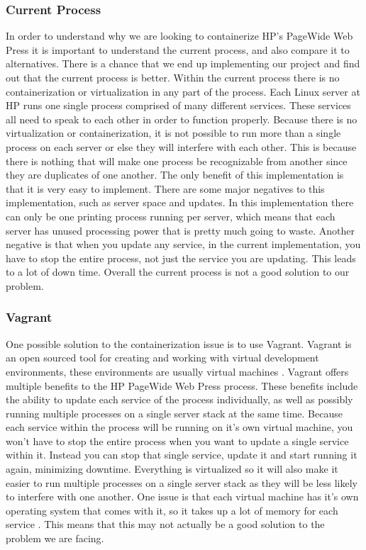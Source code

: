 \documentclass[onecolumn, draftclsnofoot,10pt, compsoc]{IEEEtran}
\begin{document}
    \subsubsection{Current Process}
    In order to understand why we are looking to containerize HP's PageWide Web Press it is important to understand the current process, and also compare it to alternatives. There is a chance that we end up implementing our project and find out that the current process is better. Within the current process there is no containerization or virtualization in any part of the process. Each Linux server at HP runs one single process comprised of many different services. These services all need to speak to each other in order to function properly. Because there is no virtualization or containerization, it is not possible to run more than a single process on each server or else they will interfere with each other. This is because there is nothing that will make one process be recognizable from another since they are duplicates of one another. The only benefit of this implementation is that it is very easy to implement. There are some major negatives to this implementation, such as server space and updates. In this implementation there can only be one printing process running per server, which means that each server has unused processing power that is pretty much going to waste. Another negative is that when you update any service, in the current implementation, you have to stop the entire process, not just the service you are updating. This leads to a lot of down time. Overall the current process is not a good solution to our problem.

    \subsubsection{Vagrant}
    One possible solution to the containerization issue is to use Vagrant. Vagrant is an open sourced tool for creating and working with virtual development environments, these environments are usually virtual machines \cite{vagrant}. Vagrant offers multiple benefits to the HP PageWide Web Press process. These benefits include the ability to update each service of the process individually, as well as possibly running multiple processes on a single server stack at the same time. Because each service within the process will be running on it's own virtual machine, you won't have to stop the entire process when you want to update a single service within it. Instead you can stop that single service, update it and start running it again, minimizing downtime. Everything is virtualized so it will also make it easier to run multiple processes on a single server stack as they will be less likely to interfere with one another. One issue is that each virtual machine has it's own operating system that comes with it, so it takes up a lot of memory for each service \cite{VagvDoc}. This means that this may not actually be a good solution to the problem we are facing.
    
\end{document}
